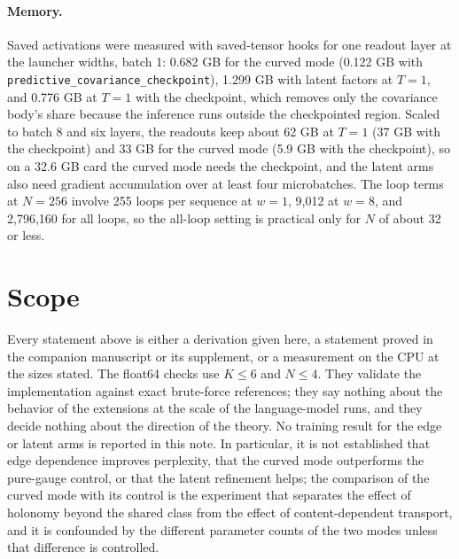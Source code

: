 \documentclass[11pt]{article}
\theoremstyle{definition}
\theoremstyle{remark}
\providecommand{\cfg}[1]{{\small\texttt{#1}}}
\begin{document}
\paragraph{Memory.}
Saved activations were measured with saved-tensor hooks for one readout layer at the launcher widths, batch 1: 0.682 GB for the curved mode (0.122 GB with \cfg{predictive\_covariance\_checkpoint}), 1.299 GB with latent factors at $T=1$, and 0.776 GB at $T=1$ with the checkpoint, which removes only the covariance body's share because the inference runs outside the checkpointed region. Scaled to batch 8 and six layers, the readouts keep about 62 GB at $T=1$ (37 GB with the checkpoint) and 33 GB for the curved mode (5.9 GB with the checkpoint), so on a 32.6 GB card the curved mode needs the checkpoint, and the latent arms also need gradient accumulation over at least four microbatches. The loop terms at $N=256$ involve 255 loops per sequence at $w=1$, 9,012 at $w=8$, and 2,796,160 for all loops, so the all-loop setting is practical only for $N$ of about 32 or less.

\section{Scope}
\label{sec:scope}

Every statement above is either a derivation given here, a statement proved in the companion manuscript or its supplement, or a measurement on the CPU at the sizes stated. The float64 checks use $K\le6$ and $N\le4$. They validate the implementation against exact brute-force references; they say nothing about the behavior of the extensions at the scale of the language-model runs, and they decide nothing about the direction of the theory. No training result for the edge or latent arms is reported in this note. In particular, it is not established that edge dependence improves perplexity, that the curved mode outperforms the pure-gauge control, or that the latent refinement helps; the comparison of the curved mode with its control is the experiment that separates the effect of holonomy beyond the shared class from the effect of content-dependent transport, and it is confounded by the different parameter counts of the two modes unless that difference is controlled.
\end{document}
